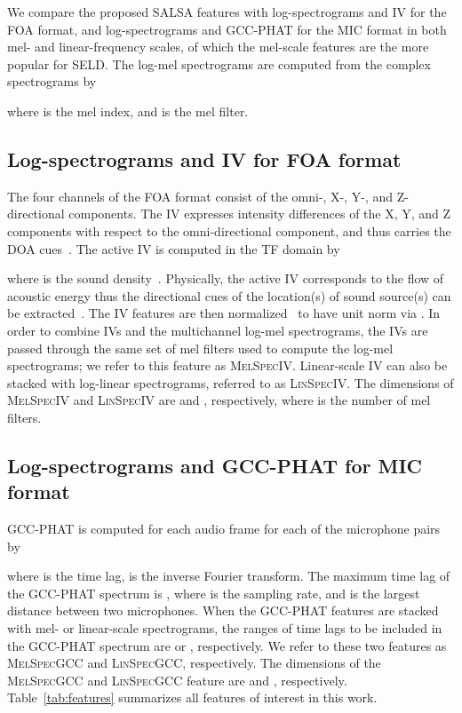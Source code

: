 \documentclass[journal]{IEEEtran}
\newcommand*{\gccphat}{\mbox{GCC-PHAT}\xspace}
\begin{document}
We compare the proposed SALSA features with log-spectrograms and IV for the FOA format, and log-spectrograms and \gccphat for the MIC format in both mel- and linear-frequency scales, of which the mel-scale features are the more popular for SELD. The log-mel spectrograms are computed from the complex spectrograms  by

where  is the mel index, and  is the mel filter. 

\subsection{Log-spectrograms and IV for FOA format}

The four channels of the FOA format consist of the \mbox{omni-,} X-, Y-, and Z-directional components. The IV expresses intensity differences of the X, Y, and Z components with respect to the omni-directional component, and thus carries the DOA cues~\cite{Zhao2014UnderdeterminedSensor, Cao2019Two-StageCross-Correlation}. The active IV is computed in the TF domain by

where  is the sound density~\cite{Cao2020Event-independentDetection}. Physically, the active IV corresponds to the flow of acoustic energy thus the directional cues of the location(s) of sound source(s) can be extracted~\cite{Delikaris-Manias2017DOAVectors}. The IV features are then normalized~\cite{Cao2020Event-independentDetection} to have unit norm via . In order to combine IVs and the multichannel log-mel spectrograms, the IVs are passed through the same set of mel filters  used to compute the log-mel spectrograms; we refer to this feature as \textsc{MelSpecIV}. Linear-scale IV can also be stacked with log-linear spectrograms, referred to as \textsc{LinSpecIV}. The dimensions of \textsc{MelSpecIV} and \textsc{LinSpecIV} are  and , respectively, where  is the number of mel filters.

\subsection{Log-spectrograms and \gccphat for MIC format}

\gccphat is computed for each audio frame for each of the microphone pairs  by~\cite{Cao2019PolyphonicStrategy}

where  is the time lag,  is the inverse Fourier transform. The maximum time lag of the \gccphat spectrum is , where  is the sampling rate, and  is the largest distance between two microphones. When the \gccphat features are stacked with mel- or linear-scale spectrograms, the ranges of time lags to be included in the \gccphat spectrum are  or , respectively. We refer to these two features as \textsc{MelSpecGCC} and \textsc{LinSpecGCC}, respectively. The dimensions of the \textsc{MelSpecGCC} and \textsc{LinSpecGCC} feature are  and , respectively. Table~\ref{tab:features} summarizes all features of interest in this work. 
\end{document}
